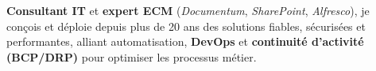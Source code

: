 \par{
\textbf{Consultant IT} et \textbf{expert ECM} (\textit{Documentum}, \textit{SharePoint}, \textit{Alfresco}), je conçois et déploie depuis plus de 20 ans des solutions fiables,
sécurisées et performantes, alliant automatisation, \textbf{DevOps} et \textbf{continuité d’activité (BCP/DRP)} pour optimiser les processus métier.
}